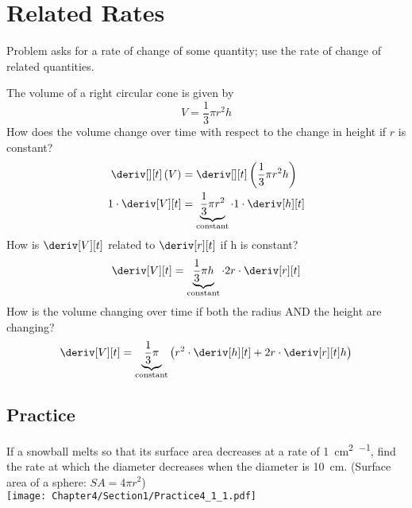 
\section{Related Rates}
Problem asks for a rate of change of some quantity; use the rate of change of related quantities.
\begin{example}
    The volume of a right circular cone is given by
    \begin{equation*}
        V = \dfrac{1}{3}\pi r^2h
    \end{equation*}
    How does the volume change over time with respect to the change in height if $r$ is constant?
    \begin{align*}
        \deriv[][t]\left(V\right) &= \deriv[][t]\left(\dfrac{1}{3}\pi r^2 h\right) \\
        1 \cdot \deriv[V][t] &= \underbrace{\dfrac{1}{3}\pi r^2}_\text{constant} \cdot 1 \cdot \deriv[h][t]
    \end{align*}
    How is $\deriv[V][t]$ related to $\deriv[r][t]$ if h is constant?
    \begin{equation*}
        \deriv[V][t] = \underbrace{\dfrac{1}{3}\pi h}_\text{constant} \cdot 2r \cdot \deriv[r][t]
    \end{equation*}
    How is the volume changing over time if both the radius AND the height are changing?
    \begin{equation*}
        \deriv[V][t] = \underbrace{\dfrac{1}{3}\pi}_\text{constant}\left(r^2 \cdot \deriv[h][t] + 2r \cdot \deriv[r][t]h\right)
    \end{equation*}
\end{example}
\subsection{Practice}
If a snowball melts so that its surface area decreases at a rate of \SI{1}{\cm\squared\per\min}, find the rate at which the diameter decreases when the diameter is \SI{10}{\cm}. (Surface area of a sphere: $SA = 4\pi r^2$)\\
\texttt{[image: Chapter4/Section1/Practice4\_1\_1.pdf]}\\
